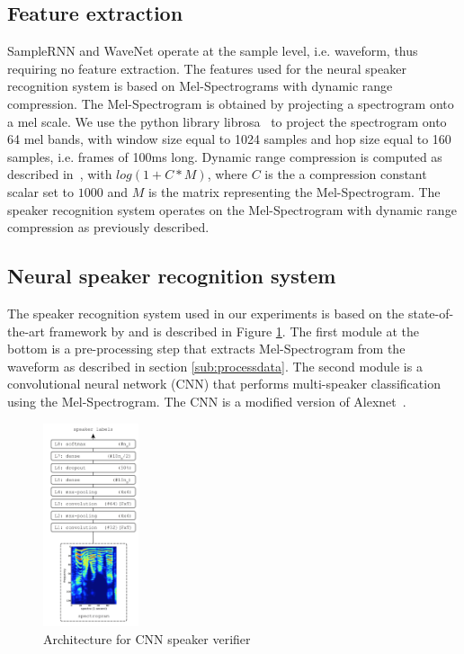 \subsection{Feature extraction}
SampleRNN and WaveNet operate at the sample level, i.e. waveform, thus requiring
no feature extraction.  The features used for the neural speaker recognition
system is based on Mel-Spectrograms with dynamic range compression. The
Mel-Spectrogram is obtained by projecting a spectrogram onto a mel scale. We use
the python library librosa~\cite{mcfee2015librosa} to project the spectrogram
onto 64 mel bands, with window size equal to 1024 samples and hop size equal to
160 samples, i.e. frames of 100ms long. Dynamic range compression is computed as
described in~\cite{lukic2016speaker}, with $log(1 + C*M)$, where $C$ is the a
compression constant scalar set to $1000$ and $M$ is the matrix representing the
Mel-Spectrogram. The speaker recognition system operates on the Mel-Spectrogram
with dynamic range compression as previously described.
                        
\subsection{Neural speaker recognition system}
\label{sub:speaker_recognition}
The speaker recognition system used in our experiments is based on the state-of-the-art framework by \cite{lukic2016speaker} and is described in Figure \ref{fig:CNN}. The first module at the bottom is a pre-processing step that extracts Mel-Spectrogram from the waveform as described in section \ref{sub:processdata}. The second module is a convolutional neural network (CNN) that performs multi-speaker classification using the Mel-Spectrogram. The CNN is a modified version of Alexnet~\cite{krizhevsky2012imagenet}.

\begin{figure}[h]
    \centering
    \includegraphics[width=0.25\textwidth]{./fig/cnn.png}
    \caption{Architecture for CNN speaker verifier}
    \label{fig:CNN}
\end{figure}

